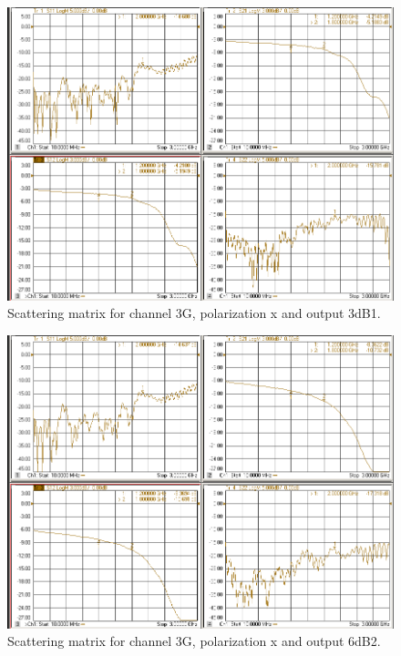 \documentclass[12pt,a4paper,oneside]{article}
\begin{document}
\begin{figure}[H]
\centering
\includegraphics[width=0.9\linewidth]{VNA_results/3Gx_3dB1.png}
\caption{Scattering matrix for channel 3G, polarization x and output 3dB1.}
\label{fig:3Gx_3dB1}
\end{figure}


\begin{figure}[H]
\centering
\includegraphics[width=0.9\linewidth]{VNA_results/3Gx_6dB2.png}
\caption{Scattering matrix for channel 3G, polarization x and output 6dB2.}
\label{fig:3Gx_6dB2}
\end{figure}
\end{document}
